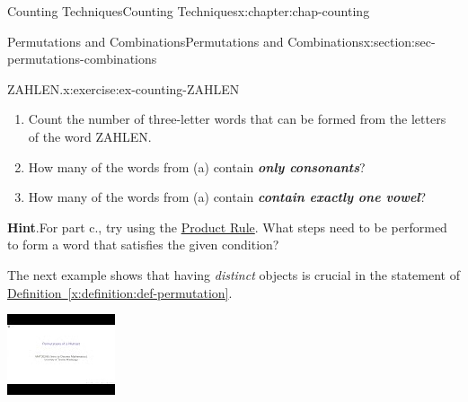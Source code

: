\documentclass[oneside,10pt,]{book}
\newcommand{\blocktitlefont}{\relax}
\newcommand{\xreffont}{\relax}
\newcommand{\alert}[1]{\textbf{\textit{#1}}}
\numberwithin{equation}{section}
\newlength{\qrsize}
\newlength{\previewwidth}
\begin{document}
\begin{chapterptx}{Counting Techniques}{}{Counting Techniques}{}{}{x:chapter:chap-counting}
\begin{sectionptx}{Permutations and Combinations}{}{Permutations and Combinations}{}{}{x:section:sec-permutations-combinations}
\begin{inlineexercise}{ZAHLEN.}{x:exercise:ex-counting-ZAHLEN}
%
\begin{enumerate}[label=(\alph*)]
\item{}Count the number of three-letter words that can be formed from the letters of the word ZAHLEN.%
\item{}How many of the words from (a) contain \alert{only consonants}?%
\item{}How many of the words from (a) contain \alert{contain exactly one vowel}?%
\end{enumerate}
%
\par\smallskip%
\noindent\textbf{\blocktitlefont Hint}.\hypertarget{g:hint:id526636}{}\quad{}For part c., try using the \hyperref[x:principle:prin-prod-rule]{Product Rule}. What steps need to be performed to form a word that satisfies the given condition?%
\end{inlineexercise}%
The next example shows that having \emph{distinct} objects is crucial in the statement of \hyperref[x:definition:def-permutation]{Definition~{\xreffont\ref{x:definition:def-permutation}}}.%
\begin{sidebyside}{1}{0}{0}{0}%
\begin{sbspanel}{1}%
\setlength{\qrsize}{9em}
\setlength{\previewwidth}{\linewidth}
\addtolength{\previewwidth}{-\qrsize}
\begin{tcbraster}[raster columns=2, raster column skip=1pt, raster halign=center, raster force size=false, raster left skip=0pt, raster right skip=0pt]%
\begin{tcolorbox}[previewstyle, width=\previewwidth]%
\includegraphics[width=0.80\linewidth,height=\qrsize,keepaspectratio]{images/video-permutation-multiset.jpg}%
\end{tcolorbox}%
\begin{tcolorbox}[qrstyle]%
{\hypersetup{urlcolor=black}}%

\end{tcolorbox}
\end{tcbraster}
\end{sbspanel}
\end{sidebyside}
\end{sectionptx}
\end{chapterptx}
\end{document}
